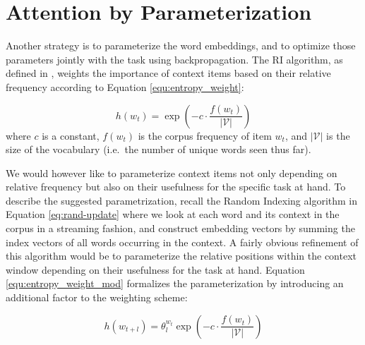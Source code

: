 \documentclass[11pt]{article}
\begin{document}
\section{Attention by Parameterization}\label{sec:att_ri}

Another strategy is to parameterize the word embeddings, and to optimize those parameters jointly with the task using backpropagation. The RI algorithm, as defined in \cite{Sahlgren:2016}, weights the importance of context items based on their relative frequency according to Equation \eqref{equ:entropy_weight}:

\begin{equation}\label{equ:entropy_weight}
h(w_t) = \exp\left({-c\cdot\frac{f(w_t)}{|\mathcal{V}|}}\right)
\end{equation}
\noindent
where $c$ is a constant, $f(w_t)$ is the corpus frequency of item $w_t$, and $|\mathcal{V}|$ is the size of the vocabulary (i.e.~the number of unique words seen thus far).

We would however like to parameterize context items not only depending on relative frequency but also on their usefulness for the specific task at hand. To describe the suggested parametrization, recall the Random Indexing algorithm in Equation \eqref{eq:rand-update} where we look at each word and its context in the corpus in a streaming fashion, and construct embedding vectors by summing the index vectors of all words occurring in the context. A fairly obvious refinement of this algorithm would be to parameterize the relative positions within the context window depending on their usefulness for the task at hand. %
Equation \eqref{equ:entropy_weight_mod} formalizes the parameterization by introducing an additional factor to the weighting scheme:


\begin{equation}\label{equ:entropy_weight_mod}
h(w_{t+l}) = \theta_l^{w_t}\exp\left({-c\cdot\frac{f(w_t)}{|\mathcal{V}|}}\right)
\end{equation}
\end{document}
